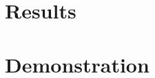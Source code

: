 \documentclass[xcolor=dvipsnames,aspectratio=169,beamer]{beamer}
\begin{document}
\begin{frame}
\begin{flushleft}
\begin{minipage}{0.6\textwidth}
	\end{minipage}
	\begin{minipage}{0.38\textwidth}
	  \centering
	\end{minipage}	
	\end{flushleft}

\end{frame}	


\section{Results}


\section{Demonstration}
\begin{frame}

	\begin{center}
	\end{center}

\end{frame}	
\end{document}
